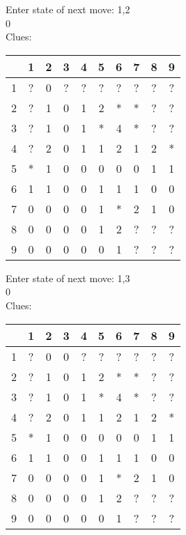 Enter state of next move: 1,2\\
0\\
Clues:\\
\begin{tabular}{|c|c|c|c|c|c|c|c|c|c|}
\hline
  & 1 & 2 & 3 & 4 & 5 & 6 & 7 & 8 & 9\\
\hline
1 & ? & 0 & ? & ? & ? & ? & ? & ? & ?\\
\hline
2 & ? & 1 & 0 & 1 & 2 & * & * & ? & ?\\
\hline
3 & ? & 1 & 0 & 1 & * & 4 & * & ? & ?\\
\hline
4 & ? & 2 & 0 & 1 & 1 & 2 & 1 & 2 & *\\
\hline
5 & * & 1 & 0 & 0 & 0 & 0 & 0 & 1 & 1\\
\hline
6 & 1 & 1 & 0 & 0 & 1 & 1 & 1 & 0 & 0\\
\hline
7 & 0 & 0 & 0 & 0 & 1 & * & 2 & 1 & 0\\
\hline
8 & 0 & 0 & 0 & 0 & 1 & 2 & ? & ? & ?\\
\hline
9 & 0 & 0 & 0 & 0 & 0 & 1 & ? & ? & ?\\
\hline
\end{tabular}

Enter state of next move: 1,3\\
0\\
Clues:\\
\begin{tabular}{|c|c|c|c|c|c|c|c|c|c|}
\hline
  & 1 & 2 & 3 & 4 & 5 & 6 & 7 & 8 & 9\\
\hline
1 & ? & 0 & 0 & ? & ? & ? & ? & ? & ?\\
\hline
2 & ? & 1 & 0 & 1 & 2 & * & * & ? & ?\\
\hline
3 & ? & 1 & 0 & 1 & * & 4 & * & ? & ?\\
\hline
4 & ? & 2 & 0 & 1 & 1 & 2 & 1 & 2 & *\\
\hline
5 & * & 1 & 0 & 0 & 0 & 0 & 0 & 1 & 1\\
\hline
6 & 1 & 1 & 0 & 0 & 1 & 1 & 1 & 0 & 0\\
\hline
7 & 0 & 0 & 0 & 0 & 1 & * & 2 & 1 & 0\\
\hline
8 & 0 & 0 & 0 & 0 & 1 & 2 & ? & ? & ?\\
\hline
9 & 0 & 0 & 0 & 0 & 0 & 1 & ? & ? & ?\\
\hline
\end{tabular}

